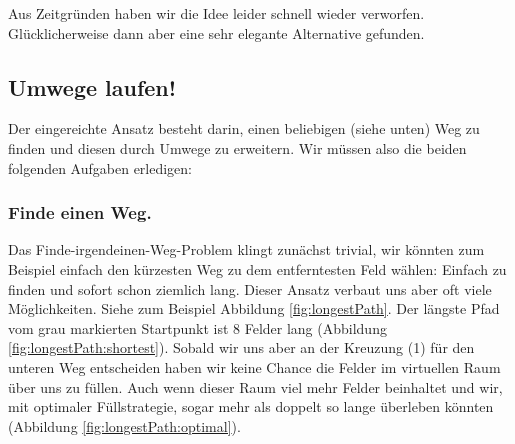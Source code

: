 Aus Zeitgründen haben wir die Idee leider schnell wieder verworfen.
Glücklicherweise dann aber eine sehr elegante Alternative gefunden.


\subsection{Umwege laufen!}
Der eingereichte Ansatz besteht darin, einen beliebigen (siehe unten) Weg zu finden und diesen durch Umwege zu erweitern.
Wir müssen also die beiden folgenden Aufgaben erledigen:

\subsubsection{Finde einen Weg.}
Das Finde-irgendeinen-Weg-Problem klingt zunächst trivial, wir könnten zum Beispiel einfach den kürzesten Weg zu dem entferntesten Feld wählen:
Einfach zu finden und sofort schon ziemlich lang.
Dieser Ansatz verbaut uns aber oft viele Möglichkeiten.
Siehe zum Beispiel Abbildung \ref{fig:longestPath}.
Der längste Pfad vom grau markierten Startpunkt ist 8 Felder lang (Abbildung \ref{fig:longestPath:shortest}).
Sobald wir uns aber an der Kreuzung (1) für den unteren Weg entscheiden haben wir keine Chance die Felder im virtuellen Raum über uns zu füllen.
Auch wenn dieser Raum viel mehr Felder beinhaltet und wir, mit optimaler Füllstrategie, sogar mehr als doppelt so lange überleben könnten (Abbildung \ref{fig:longestPath:optimal}).




